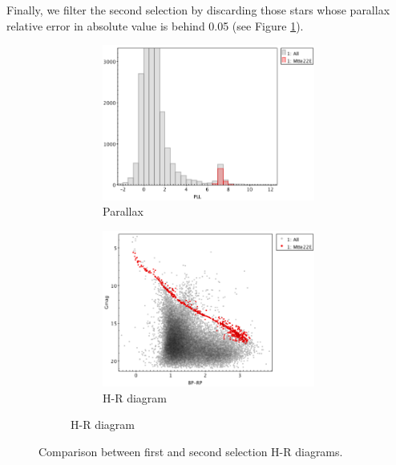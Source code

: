 \documentclass[11pt, a4paper, english]{book}
\begin{document}
Finally, we filter the second selection by discarding those stars whose parallax relative error in absolute value
is behind 0.05 (see Figure \ref{fig:clusterix_final_selection_melotte_22}).

\begin{figure}[htbp]
  \centering
  \begin{subfigure}{0.9\textwidth}
    \centering
    \begin{subfigure}[t]{0.45\textwidth}
      \centering
      \includegraphics[width=\textwidth]{../figures/clusterix/topcat_3rd_selection_parallax_melotte_22.png}
      \caption{Parallax}
    \end{subfigure}
    \hfill
    \begin{subfigure}[t]{0.45\textwidth}
      \centering
      \includegraphics[width=\textwidth]{../figures/clusterix/topcat_3rd_selection_hr_diagram_melotte_22.png}
      \caption{H-R diagram}
    \end{subfigure}
  \end{subfigure}
  \caption{Comparison between first and second selection H-R diagrams.}
  \label{fig:clusterix_final_selection_melotte_22}
\end{figure}
\end{document}
